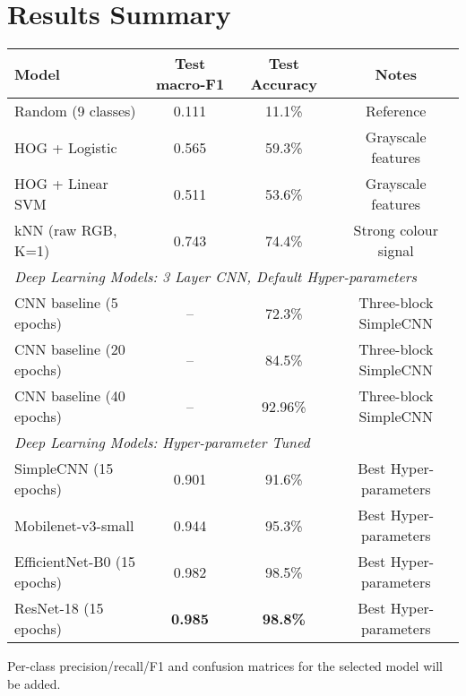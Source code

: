 \documentclass[11pt,a4paper]{article}
\begin{document}
\section{Results Summary}
\begin{center}
\begin{tabular}{lccc}
\toprule
Model & Test macro-F1 & Test Accuracy & Notes \\
\midrule
Random (9 classes) & 0.111& 11.1\% & Reference \\
HOG + Logistic & 0.565& 59.3\% & Grayscale features\\
HOG + Linear SVM & 0.511& 53.6\% & Grayscale features\\
kNN (raw RGB, K=1) & 0.743& 74.4\% & Strong colour signal \\
\midrule
\multicolumn{4}{l}{\textit{Deep Learning Models: 3 Layer CNN, Default Hyper-parameters}} \\[2pt]
\midrule
CNN baseline (5 epochs) & -- & 72.3\% & Three-block SimpleCNN \\
CNN baseline (20 epochs) & -- & 84.5\% & Three-block SimpleCNN \\
CNN baseline (40 epochs) & -- & 92.96\% & Three-block SimpleCNN \\
\midrule
\multicolumn{4}{l}{\textit{Deep Learning Models: Hyper-parameter Tuned}} \\[2pt]
\midrule
SimpleCNN (15 epochs) & 0.901 & 91.6\% & Best Hyper-parameters \\
Mobilenet-v3-small & 0.944 & 95.3\% & Best Hyper-parameters \\
EfficientNet-B0 (15 epochs) & 0.982 & 98.5\% & Best Hyper-parameters \\
ResNet-18 (15 epochs) & \textbf{0.985} & \textbf{98.8\%} & Best Hyper-parameters \\
\bottomrule
\end{tabular}
\end{center}
Per-class precision/recall/F1 and confusion matrices for the selected model will be added.
\end{document}
